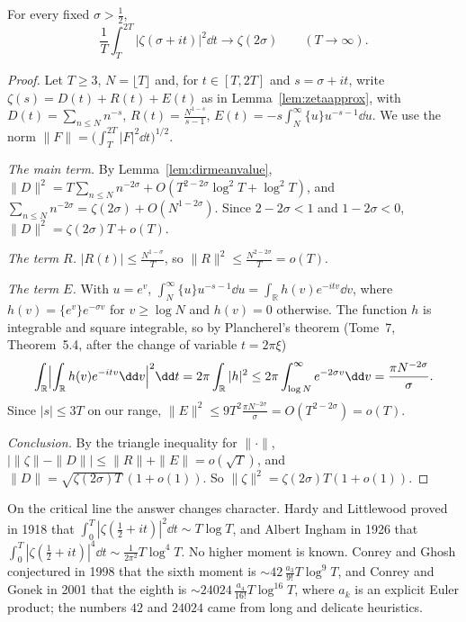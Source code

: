 \begin{theorem}\label{thm:meansquare}
For every fixed $\sigma>\frac12$,
\[
\frac1T\int_T^{2T}|\zeta(\sigma+it)|^2\dd t\longrightarrow\zeta(2\sigma)\qquad(T\to\infty).
\]
\end{theorem}
\begin{proof}
Let $T\ge3$, $N=\lfloor T\rfloor$ and, for $t\in[T,2T]$ and $s=\sigma+it$, write $\zeta(s)=D(t)+R(t)+E(t)$ as in Lemma~\ref{lem:zetaapprox}, with
$D(t)=\sum_{n\le N}n^{-s}$, $R(t)=\frac{N^{1-s}}{s-1}$, $E(t)=-s\int_N^\infty\{u\}u^{-s-1}\dd u$. We use the norm $\|F\|=\bigl(\int_T^{2T}|F|^2\dd t\bigr)^{1/2}$.

\emph{The main term.} By Lemma~\ref{lem:dirmeanvalue}, $\|D\|^2=T\sum_{n\le N}n^{-2\sigma}+O(T^{2-2\sigma}\log^2T+\log^2T)$, and
$\sum_{n\le N}n^{-2\sigma}=\zeta(2\sigma)+O(N^{1-2\sigma})$. Since $2-2\sigma<1$ and $1-2\sigma<0$, $\|D\|^2=\zeta(2\sigma)T+o(T)$.

\emph{The term $R$.} $|R(t)|\le\frac{N^{1-\sigma}}T$, so $\|R\|^2\le\frac{N^{2-2\sigma}}T=o(T)$.

\emph{The term $E$.} With $u=e^v$, $\int_N^\infty\{u\}u^{-s-1}\dd u=\int_{\mathbb R}h(v)e^{-itv}\dd v$, where $h(v)=\{e^v\}e^{-\sigma v}$ for $v\ge\log N$ and $h(v)=0$
otherwise. The function $h$ is integrable and square integrable, so by Plancherel's theorem (Tome~7, Theorem~5.4, after the change of variable $t=2\pi\xi$)
\[
\int_{\mathbb R}\Bigl|\int_{\mathbb R}h(v)e^{-itv}\dd v\Bigr|^2\dd t=2\pi\int_{\mathbb R}|h|^2\le2\pi\int_{\log N}^\infty e^{-2\sigma v}\dd v=\frac{\pi N^{-2\sigma}}\sigma.
\]
Since $|s|\le3T$ on our range, $\|E\|^2\le9T^2\frac{\pi N^{-2\sigma}}\sigma=O(T^{2-2\sigma})=o(T)$.

\emph{Conclusion.} By the triangle inequality for $\|\cdot\|$, $\bigl|\|\zeta\|-\|D\|\bigr|\le\|R\|+\|E\|=o(\sqrt T)$, and $\|D\|=\sqrt{\zeta(2\sigma)T}\,(1+o(1))$. So
$\|\zeta\|^2=\zeta(2\sigma)T(1+o(1))$.
\end{proof}

On the critical line the answer changes character. Hardy and Littlewood proved in 1918 that $\int_0^T|\zeta(\frac12+it)|^2\dd t\sim T\log T$, and Albert
Ingham in 1926 that $\int_0^T|\zeta(\frac12+it)|^4\dd t\sim\frac1{2\pi^2}T\log^4T$. No higher moment is known. Conrey and Ghosh conjectured in 1998 that
the sixth moment is $\sim42\,\frac{a_3}{9!}T\log^9T$, and Conrey and Gonek in 2001 that the eighth is $\sim24024\,\frac{a_4}{16!}T\log^{16}T$, where $a_k$ is
an explicit Euler product; the numbers $42$ and $24024$ came from long and delicate heuristics.

